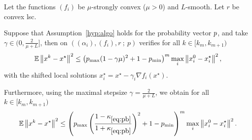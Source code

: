 \begin{theorem}\label{lm:spy_diff}
Let the functions $(f_i)$ be $\mu$-strongly convex ($\mu>0$) and $L$-smooth. Let $r$ be convex lsc. 

Suppose that Assumption~\ref{hyp:algo} holds for the probability vector ${p}$, and take $\gamma \in (0, \frac{2}{\mu + L}]$,  then \salgo on $((\alpha_i),(f_i), r  ~ ; ~  p)$ verifies for all $k\in [k_m, k_{m+1})$
\begin{align}
\label{eq:dif_prob}
   \mathbb{E} \left\| x^k - x^\star \right\|^2 \le \left( p_{\max} (1 - \gamma \mu)^2 + 1 - p_{\min}  \right)^{m} \max_i\left\|x_i^0-x_i^\star\right\|^2,
\end{align}
with the shifted local solutions $x_i^\star = x^\star - \gamma_i\nabla f_i(x^\star)$. 

Furthermore, using the maximal stepsize $\gamma = \frac{2}{\mu + L}$, we obtain for all $k\in [k_m, k_{m+1})$
\begin{align}
\label{eq:ratebefore}
 \mathbb{E}   \left\| x^k - x^\star \right\|^2 \le \left( p_{\max} \left(\frac{1-\kappa_{\eqref{eq:pb}}}{1+\kappa_{\eqref{eq:pb}}}\right)^2 + 1 - p_{\min}  \right)^{m} \max_i\left\|x_i^0-x_i^\star\right\|^2.
\end{align}
\end{theorem}

